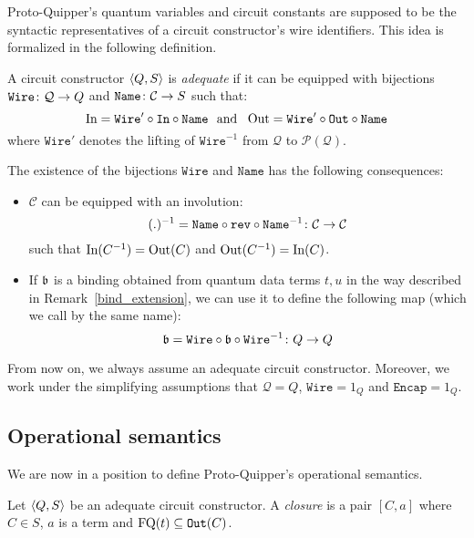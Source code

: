 \documentclass[twoside]{article}
\begin{document}
Proto-Quipper's quantum variables and circuit constants are supposed 
to be the syntactic representatives of a circuit constructor's wire 
identifiers. This idea is formalized in the following definition.

\begin{definition}
A circuit constructor $\langle Q,S\rangle$ is \emph{adequate} if it can 
be equipped with bijections $\mathtt{Wire}\colon \mathcal{Q} \to Q$ 
and $\mathtt{Name}\colon \mathcal{C} \to S$ such that:
\[\mathop{\textrm{In}}\nolimits=\mathtt{Wire}' \circ\mathtt{In}\circ \mathtt{Name} 
~\mbox{ and }~ 
\mathop{\textrm{Out}}\nolimits=\mathtt{Wire}'\circ\mathtt{Out}\circ \mathtt{Name}
\]
where $\mathtt{Wire}'$ denotes the lifting of $\mathtt{Wire}^{-1}$ 
from $\mathcal{Q}$ to $\mathcal{P}(\mathcal{Q})$.
\end{definition}

\begin{remark}
\label{structure-transfer}
The existence of the bijections $\mathtt{Wire}$ and $\mathtt{Name}$ has 
the following consequences:
\begin{itemize}
  \item $\mathcal{C}$ can be equipped with an involution:
\[
(.)^{-1} = \mathtt{Name}\circ \mathtt{rev} \circ \mathtt{Name}^{-1}
           \colon \mathcal{C}\to\mathcal{C}
\]
such that $\mathop{\textrm{In}}\nolimits(C^{-1})=\mathop{\textrm{Out}}\nolimits(C)$ and 
$\mathop{\textrm{Out}}\nolimits(C^{-1})=\mathop{\textrm{In}}\nolimits(C)$.
  \item If $\mathfrak{b}$ is a binding obtained from quantum data terms $t,u$ in the 
  way described in Remark~\hyperref[bind_extension]{\ref*{bind_extension}}, 
  we can use it to define the following map (which we call by the same name):
  \[
  \mathfrak{b} = \mathtt{Wire}\circ \mathfrak{b}\circ \mathtt{Wire}^{-1}\colon Q\to Q
  \]
\end{itemize}

From now on, we always assume an adequate circuit constructor. Moreover, we work 
under the simplifying assumptions that $\mathcal{Q}=Q$, $\mathtt{Wire}=1_Q$ 
and $\mathtt{Encap}=1_Q$.
\end{remark}


\subsection{Operational semantics}

We are now in a position to define Proto-Quipper's operational 
semantics.

\begin{definition}
Let $\langle Q,S\rangle$ be an adequate circuit constructor. A 
\emph{closure} is a pair $[C,a]$ where $C\in S$, $a$ is a 
term and $\mathop{\textrm{FQ}}\nolimits(t)\subseteq\mathtt{Out}(C)$. 
\end{definition}
\end{document}
